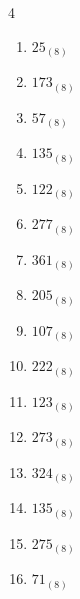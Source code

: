 \begin{multicols}{4}
\begin{enumerate}
  \item $25_{(8)}$

        \phantom{$=21$}

  \item $173_{(8)}$

        \phantom{$=123$}

  \item $57_{(8)}$

        \phantom{$=47$}

  \item $135_{(8)}$

        \phantom{$=93$}

  \item $122_{(8)}$

        \phantom{$=82$}

  \item $277_{(8)}$

        \phantom{$=191$}

  \item $361_{(8)}$

        \phantom{$=241$}

  \item $205_{(8)}$

        \phantom{$=133$}

  \item $107_{(8)}$

        \phantom{$=71$}

  \item $222_{(8)}$

        \phantom{$=146$}

\columnbreak %

  \item $123_{(8)}$

        \phantom{$=83$}

  \item $273_{(8)}$

        \phantom{$=187$}

  \item $324_{(8)}$

        \phantom{$=212$}

  \item $135_{(8)}$

        \phantom{$=93$}

  \item $275_{(8)}$

        \phantom{$=189$}

  \item $71_{(8)}$


\end{enumerate}
\end{multicols}
